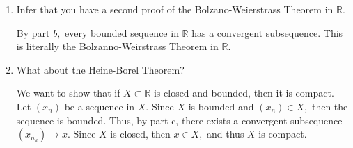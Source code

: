 \documentclass[11pt]{article}
\newcommand{\bbR}{\mathbb{R}}
\begin{document}
\begin{enumerate}
\begin{solution}
\end{solution}
\item 
\begin{problem}
    Infer that you have a second proof of the Bolzano-Weierstrass Theorem in
 $\bbR$.
\end{problem}
\begin{solution}
        By part $b,$ every bounded sequence in $\bbR$ has a convergent subsequence. This is literally the Bolzanno-Weirstrass Theorem in $\bbR.$
\end{solution}
\item 
\begin{problem}
    What about the Heine-Borel Theorem?
\end{problem}
\begin{solution}
    We want to show that if $X\subset \bbR$ is closed and bounded, then it is compact. Let $(x_n)$ be a sequence in $X.$ Since $X$ is bounded and $(x_n)\in X,$ then the sequence is bounded. Thus, by part c, there exists a convergent subsequence $(x_{n_k})\to x.$ Since $X$ is closed, then $x\in X,$ and thus $X$ is compact.
\end{solution}
\end{enumerate}

\newpage
\end{document}
